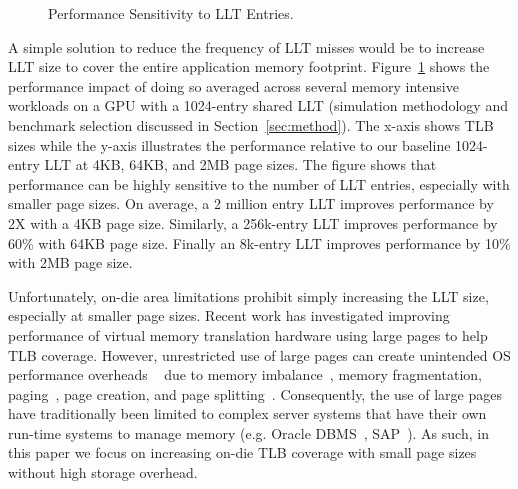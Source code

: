 \begin{figure}[t] 
\vspace{0. in}
\centering
\centerline{}

	\caption{\small Performance Sensitivity to LLT Entries. \normalsize}

\label{fig:tlb_sensitivity} 
\vspace{-0.15 in}
\end{figure}

A simple solution to reduce the frequency of LLT misses would be to
increase LLT size to cover the entire application memory footprint.
Figure~\ref{fig:tlb_sensitivity} shows the performance impact of doing
so averaged across several memory intensive workloads on a GPU with a
1024-entry shared LLT (simulation methodology and benchmark selection
discussed in Section~\ref{sec:method}). The x-axis shows TLB sizes
while the y-axis illustrates the performance relative to our baseline
1024-entry LLT at 4KB, 64KB, and 2MB page sizes. The figure shows that
performance can be highly sensitive to the number of LLT entries,
especially with smaller page sizes. On average, a 2 million entry LLT
improves performance by 2X with a 4KB page size. Similarly, a
256k-entry LLT improves performance by 60\% with 64KB page size.
Finally an 8k-entry LLT improves performance by 10\% with 2MB page
size.

Unfortunately, on-die area limitations prohibit simply increasing the
LLT size, especially at smaller page sizes. Recent work has
investigated improving performance of virtual memory translation
hardware using large pages to help TLB coverage.
However, unrestricted use of large pages can create unintended OS
performance overheads ~\cite{SuperPageProblem, TwoPageSize} due to
memory imbalance~\cite{numa-harmful}, memory fragmentation,
paging~\cite{cameo}, page creation, and page
splitting~\cite{largepagevm}. Consequently, the use of large pages
have traditionally been limited to complex server systems that have
their own run-time systems to manage memory (e.g. Oracle
DBMS~\cite{oracle_dbms}, SAP~\cite{sap}). As such, in this paper we
focus on increasing on-die TLB coverage with small page sizes without
high storage overhead.


